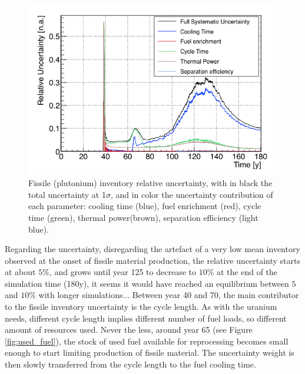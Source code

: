 \documentclass{anstrans}
\begin{document}
\begin{figure}[h!!] %
    \centering
    \includegraphics[scale=0.35]{pu_uncer}
    \caption{Fissile (plutonium) inventory relative uncertainty, with
    in black the total uncertainty at 1$\sigma$, and in color the uncertainty
    contribution of each parameter: cooling time (blue), fuel enrichment (red),
    cycle time (green), thermal power(brown), separation efficiency (light
    blue).}\label{fig:pu_uncer}
\end{figure}

Regarding the uncertainty, disregarding the artefact of a very low mean inventory
observed at the onset of fissile material production, the relative uncertainty
starts at about $5\%$, and grows until year
125 to decrease to $10\%$ at the end of the simulation time (180y), it seems
it would have reached an equilibrium between $5$ and $10\%$ with longer
simulations...
Between year 40 and 70, the main contributor to the fissile inventory
uncertainty is the cycle length.  As with the uranium needs, different cycle length
implies different number of fuel loads, so different amount of resources used.  Never the less, around year 65 (see Figure
\ref{fig:used_fuel}), the stock of used fuel available for reprocessing becomes
small enough to start limiting production of fissile material.
The uncertainty weight is then slowly transferred from
the cycle length to the fuel cooling time.
\end{document}
